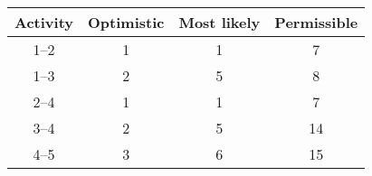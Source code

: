 \begin{center}
\begin{tabular}[12pt]{ |c| c| c| c| }
\hline
\textbf{Activity} & \textbf{Optimistic} & \textbf{Most likely} & \textbf{Permissible}\\
\hline
1--2 & 1 & 1 & 7\\
\hline
1--3 & 2 & 5 & 8\\
\hline
2--4 & 1 & 1 & 7\\
\hline
3--4 & 2 & 5 & 14\\
\hline
4--5 & 3 & 6 & 15\\
\hline
\end{tabular}
\end{center}